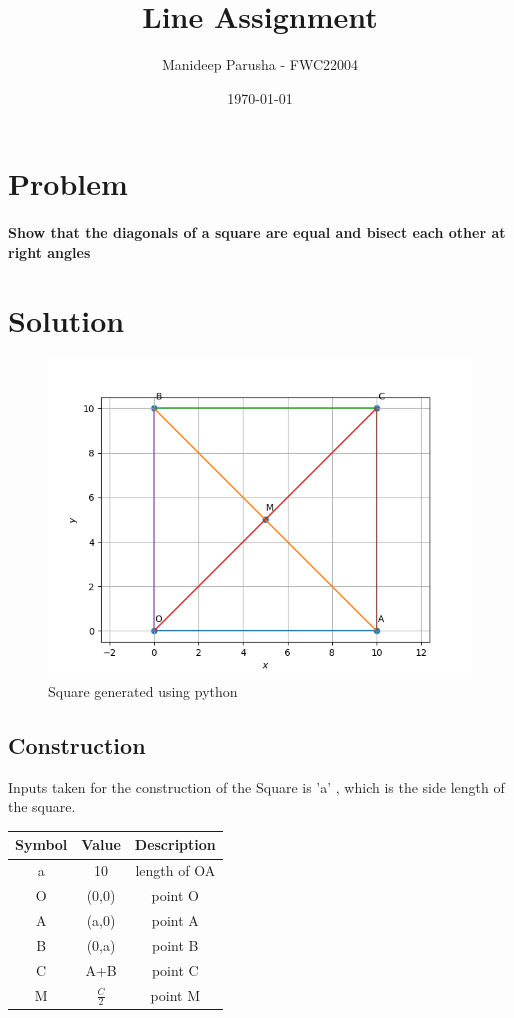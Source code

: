 \documentclass[journal,12pt,twocolumn]{article}
\title{\textbf{Line Assignment}}
\author{Manideep Parusha - FWC22004}
\date{\today}
\begin{document}
\maketitle
\section*{Problem}
\paragraph{Show that the diagonals of a square are equal and bisect each other at right angles}

\section*{Solution}

\begin{figure}[h]
\centering
\includegraphics[width=\columnwidth]{figs/sq_plot.png}
\caption{Square generated using python}
\label{fig:sq_py}
\end{figure}

\subsection*{Construction}
Inputs taken for the construction of the Square is 'a' , which is the side length of the square.
\begin{table}[h]
	\centering
\setlength\extrarowheight{2pt}
	\begin{tabular}{|c|c|c|}
		\hline
		\textbf{Symbol} & \textbf{Value} & \textbf{Description} \\
		\hline
		a & 10 & length of OA\\
		\hline
		O & (0,0) & point O\\
		\hline
		A & (a,0) & point A\\
		\hline
		B & (0,a) & point B\\
		\hline
		C & A+B & point C\\
		\hline
		M & $\frac{C}{2}$ & point M\\
		\hline
	\end{tabular}
\end{table}
\end{document}
